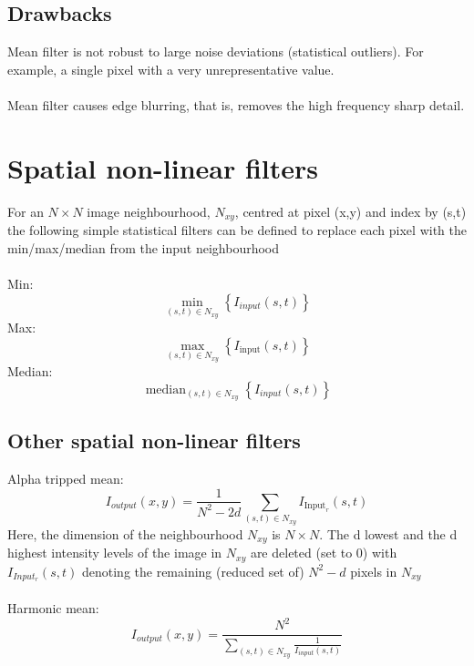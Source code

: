 \documentclass{article}[18pt]
\begin{document}
\subsection{Drawbacks}
Mean filter is not robust to large noise deviations (statistical outliers). For example, a single pixel with a very unrepresentative value.\\
\\
Mean filter causes edge blurring, that is, removes the high frequency sharp detail.
\section{Spatial non-linear filters}
For an $N\times N$ image neighbourhood, $N_{xy}$, centred at pixel (x,y)  and index by (s,t) the following simple statistical filters can be defined to replace each pixel with the min/max/median from the input neighbourhood\\
\\
Min:
\[
\min _{(s, t) \in N_{x y}}\left\{I_{i n p u t}(s, t)\right\}
\]
Max:
\[
\max _{(s, t) \in N_{x y}}\left\{I_{\text {input}}(s, t)\right\}
\]
Median:
\[
\operatorname{median}_{(s, t) \in N_{x y}}\left\{I_{i n p u t}(s, t)\right\}
\]
\subsection{Other spatial non-linear filters}
Alpha tripped mean:
\[
I_{o u t p u t}(x, y)=\frac{1}{N^{2}-2 d} \sum_{(s, t) \in N_{x y}} I_{\text {Input}_r}(s, t)
\]
Here, the dimension of the neighbourhood $N_{xy}$ is $N\times N$. The d lowest and the d highest intensity levels of the image in $N_{xy}$ are deleted (set to 0) with $I_{Input_r}(s,t)$ denoting the remaining (reduced set of) $N^2-d$ pixels in $N_{xy}$\\
\\
Harmonic mean:
{\Large
\[
I_{o u t p u t}(x, y)=\frac{N^{2}}{\sum_{(s, t) \in N _{x y}} \frac{1}{I_{i n p u t}(s, t)}}
\]
}
\end{document}
